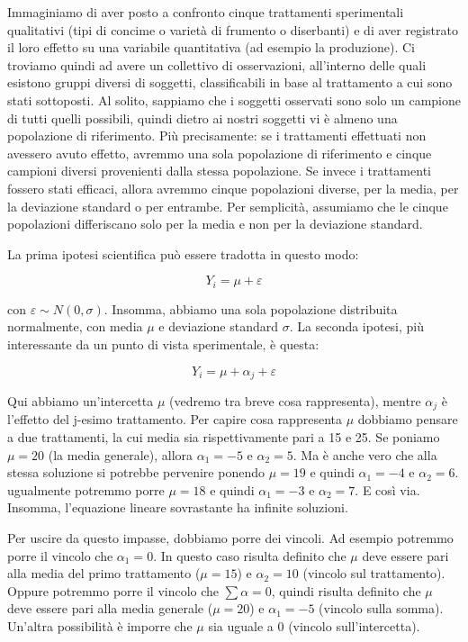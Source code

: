 \documentclass[a4paper,12pt,oneside]{book}
\theoremstyle{definition}
\theoremstyle{definition}
\theoremstyle{definition}
\theoremstyle{remark}
\begin{document}
Immaginiamo di aver posto a confronto cinque trattamenti sperimentali
qualitativi (tipi di concime o varietà di frumento o diserbanti) e di
aver registrato il loro effetto su una variabile quantitativa (ad
esempio la produzione). Ci troviamo quindi ad avere un collettivo di
osservazioni, all'interno delle quali esistono gruppi diversi di
soggetti, classificabili in base al trattamento a cui sono stati
sottoposti. Al solito, sappiamo che i soggetti osservati sono solo un
campione di tutti quelli possibili, quindi dietro ai nostri soggetti vi
è almeno una popolazione di riferimento. Più precisamente: se i
trattamenti effettuati non avessero avuto effetto, avremmo una sola
popolazione di riferimento e cinque campioni diversi provenienti dalla
stessa popolazione. Se invece i trattamenti fossero stati efficaci,
allora avremmo cinque popolazioni diverse, per la media, per la
deviazione standard o per entrambe. Per semplicità, assumiamo che le
cinque popolazioni differiscano solo per la media e non per la
deviazione standard.

La prima ipotesi scientifica può essere tradotta in questo modo:

\[ Y_i = \mu + \varepsilon\]

con \(\varepsilon \sim N(0, \sigma)\). Insomma, abbiamo una sola
popolazione distribuita normalmente, con media \(\mu\) e deviazione
standard \(\sigma\). La seconda ipotesi, più interessante da un punto di
vista sperimentale, è questa:

\[Y_i = \mu + \alpha_j + \varepsilon\]

Qui abbiamo un'intercetta \(\mu\) (vedremo tra breve cosa rappresenta),
mentre \(\alpha_j\) è l'effetto del j-esimo trattamento. Per capire cosa
rappresenta \(\mu\) dobbiamo pensare a due trattamenti, la cui media sia
rispettivamente pari a 15 e 25. Se poniamo \(\mu = 20\) (la media
generale), allora \(\alpha_1 = - 5\) e \(\alpha_2 = 5\). Ma è anche vero
che alla stessa soluzione si potrebbe pervenire ponendo \(\mu = 19\) e
quindi \(\alpha_1 = -4\) e \(\alpha_2 = 6\). ugualmente potremmo porre
\(\mu = 18\) e quindi \(\alpha_1 = -3\) e \(\alpha_2 = 7\). E così via.
Insomma, l'equazione lineare sovrastante ha infinite soluzioni.

Per uscire da questo impasse, dobbiamo porre dei vincoli. Ad esempio
potremmo porre il vincolo che \(\alpha_1 = 0\). In questo caso risulta
definito che \(\mu\) deve essere pari alla media del primo trattamento
(\(\mu = 15\)) e \(\alpha_2 = 10\) (vincolo sul trattamento). Oppure
potremmo porre il vincolo che \(\sum{\alpha} = 0\), quindi risulta
definito che \(\mu\) deve essere pari alla media generale (\(\mu = 20\))
e \(\alpha_1 = -5\) (vincolo sulla somma). Un'altra possibilità è
imporre che \(\mu\) sia uguale a 0 (vincolo sull'intercetta).
\end{document}
